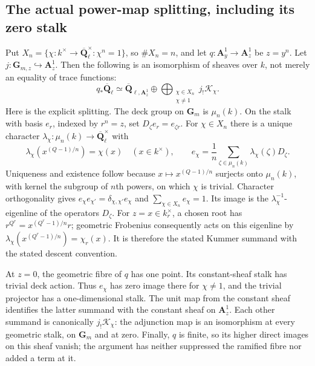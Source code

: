 \subsection{The actual power-map splitting, including its zero stalk}

Put \(X_n=\{\chi:k^\times\to\overline{\mathbf Q}_\ell^\times:
\chi^n=1\}\), so \(\#X_n=n\), and let
\(q:\mathbf A^1_y\to\mathbf A^1_z\) be \(z=y^n\).
Let \(j:\mathbf G_{m,z}\hookrightarrow\mathbf A^1_z\).
Then the following is an isomorphism of sheaves over \(k\), not
merely an equality of trace functions:
\[
 q_*\overline{\mathbf Q}_\ell
   \simeq \overline{\mathbf Q}_{\ell,\mathbf A^1_z}
     \oplus
     \bigoplus_{\substack{\chi\in X_n\\\chi\ne1}}
          j_!\mathcal K_\chi.
 \tag{SPF.9}\label{CFStage:eq:SPF9}
\]
Here is the explicit splitting. The deck group on \(\mathbf G_m\)
is \(\mu_n(k)\). On the stalk with basis \(e_r\), indexed by
\(r^n=z\), set \(D_\zeta e_r=e_{\zeta r}\). For \(\chi\in X_n\)
there is a unique character \(\lambda_\chi:\mu_n(k)\to
\overline{\mathbf Q}_\ell^\times\) with
\[
 \lambda_\chi(x^{(Q-1)/n})=\chi(x)\quad(x\in k^\times),\qquad
 e_\chi=\frac1n\sum_{\zeta\in\mu_n(k)}
                   \lambda_\chi(\zeta)D_\zeta.
 \tag{SPF.10}\label{CFStage:eq:SPF10}
\]
Uniqueness and existence follow because
\(x\mapsto x^{(Q-1)/n}\) surjects onto \(\mu_n(k)\), with kernel
the subgroup of \(n\)th powers, on which \(\chi\) is trivial.
Character orthogonality gives
\(e_\chi e_{\chi'}=\delta_{\chi,\chi'}e_\chi\) and
\(\sum_{\chi\in X_n}e_\chi=1\). Its image is the
\(\lambda_\chi^{-1}\)-eigenline of the operators \(D_\zeta\).
For \(z=x\in k_r^\times\), a chosen root has
\(r^{Q^r}=x^{(Q^r-1)/n}r\); geometric Frobenius consequently acts
on this eigenline by
\(\lambda_\chi(x^{(Q^r-1)/n})=\chi_r(x)\).
It is therefore the stated Kummer summand with the stated descent
convention.

At \(z=0\), the geometric fibre of \(q\) has one point. Its
constant-sheaf stalk has trivial deck action. Thus \(e_\chi\)
has zero image there for \(\chi\ne1\), and the trivial projector
has a one-dimensional stalk. The unit map from the constant sheaf
identifies the latter summand with the constant sheaf on
\(\mathbf A^1_z\). Each other summand is canonically \(j_!\mathcal
K_\chi\): the adjunction map is an isomorphism at every geometric
stalk, on \(\mathbf G_m\) and at zero. Finally, \(q\) is finite,
so its higher direct images on this sheaf vanish; the argument
has neither suppressed the ramified fibre nor added a term at it.

